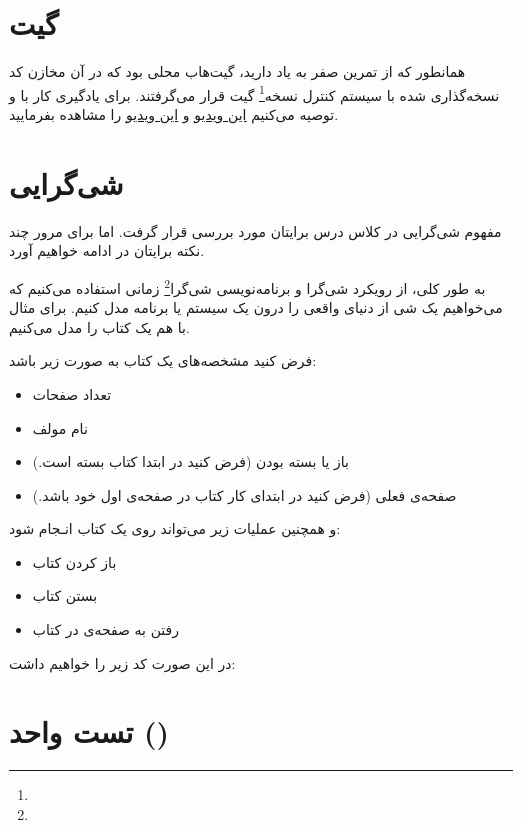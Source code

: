 \section{گیت }

همانطور که از تمرین صفر به یاد دارید، گیت‌هاب محلی بود که در آن مخازن کد نسخه‌گذاری‌ شده با سیستم کنترل نسخه\footnote{} گیت قرار می‌گرفتند.
برای یادگیری کار با  و  توصیه می‌کنیم \href{https://www.youtube.com/watch?v=tRZGeaHPoaw}{\underline{این ویدیو}} و \href{https://www.youtube.com/watch?v=HkdAHXoRtos}{\underline{این ویدیو}} را مشاهده بفرمایید.

\section{شی‌گرایی}

مفهوم شی‌گرایی در کلاس درس برایتان مورد بررسی قرار گرفت. اما برای مرور چند نکته برایتان در ادامه خواهیم آورد.

\vspace{3mm}
به طور کلی، از رویکرد شی‌گرا و برنامه‌نویسی شی‌گرا\footnote{} زمانی استفاده می‌کنیم که می‌خواهیم یک شی از دنیای واقعی را درون یک سیستم یا برنامه مدل کنیم. برای مثال با هم یک کتاب را مدل می‌کنیم.

فرض کنید مشخصه‌های یک کتاب به صورت زیر باشد:

\begin{itemize}
    \item {تعداد صفحات}
    \item {نام مولف}
    \item {باز یا بسته بودن (فرض کنید در ابتدا کتاب بسته است.)}
    \item {صفحه‌ی فعلی (فرض کنید در ابتدای کار کتاب در صفحه‌ی اول خود باشد.)}
\end{itemize}

و همچنین عملیات زیر می‌تواند روی یک کتاب انـجام شود:


\begin{itemize}
    \item {باز کردن کتاب}
    \item {بستن کتاب}
    \item {رفتن به صفحه‌ی  در کتاب}
\end{itemize}

در این صورت کد زیر را خواهیم داشت:


\section{تست واحد ()}

